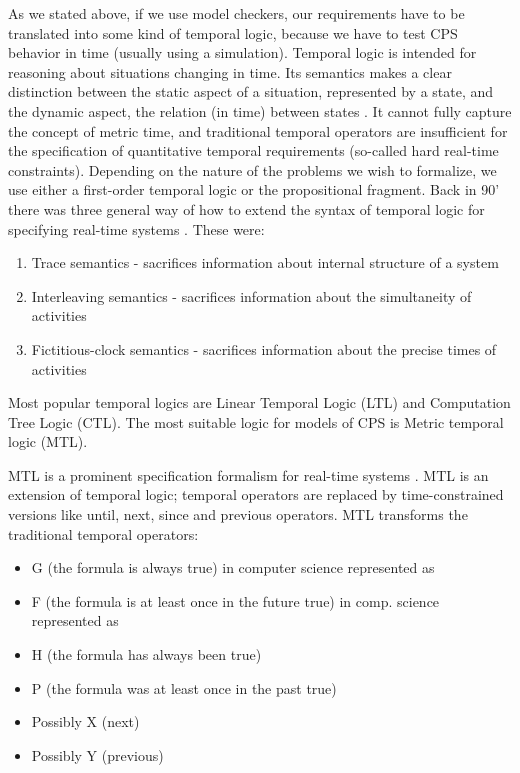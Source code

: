 As we stated above, if we use model checkers, our requirements have to be translated into some kind of temporal logic, because we have to test CPS behavior in time (usually using a simulation). Temporal logic is intended for reasoning about situations changing in time. Its semantics makes a clear distinction between the static aspect of a situation, represented by a state, and the dynamic aspect, the relation (in time) between states \cite{Koymans:MTL}. It cannot fully capture the concept of metric time, and traditional temporal operators are insufficient for the specification of quantitative temporal requirements (so-called hard real-time constraints). Depending on the nature of the problems we wish to formalize, we use either a first-order temporal logic or the propositional fragment. Back in 90’ there was three general way of how to extend the syntax of temporal logic for specifying real-time systems \cite{Rajeev:ModelsOfRealTime}. These were:

\begin{enumerate}
    \item Trace semantics - sacrifices information about internal structure of a system
    \item Interleaving semantics - sacrifices information about the simultaneity of activities
    \item Fictitious-clock semantics - sacrifices information about the precise times of activities
\end{enumerate}

Most popular temporal logics are Linear Temporal Logic (LTL) and Computation Tree Logic (CTL). The most suitable logic for models of CPS is Metric temporal logic (MTL).

MTL is a prominent specification formalism for real-time systems \cite{Ouaknine:MTLdecidability}. MTL is an extension of temporal logic; temporal operators are replaced by time-constrained versions like until, next, since and previous operators. MTL transforms the traditional temporal operators:

\begin{itemize}
    \item G (the formula is always true) in computer science represented as
    \item F (the formula is at least once in the future true) in comp. science represented as
    \item H (the formula has always been true)
    \item P (the formula was at least once in the past true)
    \item Possibly X (next)
    \item Possibly Y (previous)
\end{itemize}

